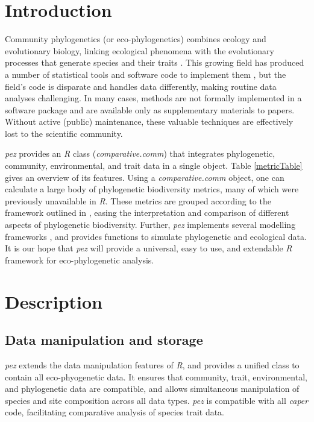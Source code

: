 \documentclass{bioinfo}
\begin{document}
\section{Introduction}
Community phylogenetics (or eco-phylogenetics) combines ecology and
evolutionary biology, linking ecological phenomena with the
evolutionary processes that generate species and their traits
\citep[see][]{Webb2002}. This growing field has produced a number of
statistical tools and software code to implement them
\citep[\emph{e.g.},][]{Kembel2010}, but the field's code is disparate
and handles data differently, making routine data analyses
challenging. In many cases, methods are not formally implemented in a
software package and are available only as supplementary materials to
papers. Without active (public) maintenance, these valuable techniques
are effectively lost to the scientific community.

\emph{pez} provides an \emph{R} \citep{R2015} class
(\emph{comparative.comm}) that integrates phylogenetic, community,
environmental, and trait data in a single object. Table
\ref{metricTable} gives an overview of its features. Using a
\emph{comparative.comm} object, one can calculate a large body of
phylogenetic biodiversity metrics, many of which were previously
unavailable in \emph{R}. These metrics are grouped according to the
framework outlined in \citet{Pearse2014review}, easing the
interpretation and comparison of different aspects of phylogenetic
biodiversity. Further, \emph{pez} implements several modelling
frameworks \citep{Cavender-Bares2004,Ives2011}, and provides functions
to simulate phylogenetic and ecological data. It is our hope that
\emph{pez} will provide a universal, easy to use, and extendable
\emph{R} framework for eco-phylogenetic analysis.
\section{Description}
\subsection{Data manipulation and storage}
\emph{pez} extends the data manipulation features of \emph{R}, and
provides a unified class to contain all eco-phyogenetic data. It
ensures that community, trait, environmental, and phylogenetic data
are compatible, and allows simultaneous manipulation of species and
site composition across all data types. \emph{pez} is compatible with
all \emph{caper} \citep{Orme2013} code, facilitating comparative
analysis of species trait data.
\end{document}
